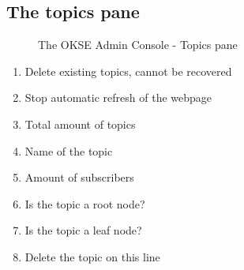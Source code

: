 
\clearpage


\subsection{The topics pane}
\begin{center}
  \begin{figure}[ht!]
    \caption{The OKSE Admin Console - Topics pane} 
    \label{fig:OKSE Admin Console - Topics pane}
  \end{figure}
\end{center}
\begin{enumerate}
\item Delete existing topics, cannot be recovered
\item Stop automatic refresh of the webpage
\item Total amount of topics
\item Name of the topic
\item Amount of subscribers
\item Is the topic a root node?
\item Is the topic a leaf node?
\item Delete the topic on this line
\end{enumerate}


